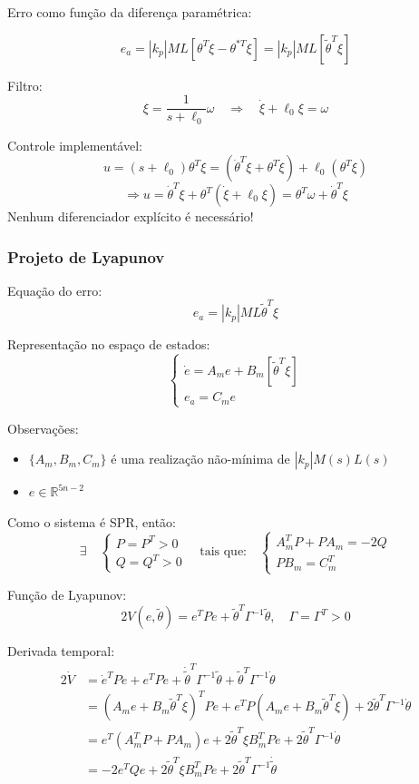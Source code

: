 \documentclass[10pt]{article}
\begin{document}
Erro como função da diferença paramétrica:

\[
e_a = |k_p| ML \left[ \theta^T \xi - \theta^{*T} \xi \right] = |k_p| ML [\tilde{\theta}^T \xi]
\]

Filtro:
\[
\xi = \frac{1}{s + \ell_0} \omega
\quad \Rightarrow \quad \dot{\xi} + \ell_0 \xi = \omega
\]

Controle implementável:
\[
u = (s + \ell_0)\theta^T \xi = (\dot{\theta}^T \xi + \theta^T \dot{\xi}) + \ell_0 (\theta^T \xi)
\]
\[
\Rightarrow u = \dot{\theta}^T \xi + \theta^T (\dot{\xi} + \ell_0 \xi)
= \theta^T \omega + \dot{\theta}^T \xi
\]
Nenhum diferenciador explícito é necessário!

\subsubsection{Projeto de Lyapunov}

Equação do erro:
\[
e_a = |k_p| ML \tilde{\theta}^T \xi
\]

Representação no espaço de estados:
\[
\begin{cases}
\dot{e} = A_m e + B_m [\tilde{\theta}^T \xi] \\
e_a = C_m e
\end{cases}
\]

Observações:
\begin{itemize}
  \item \(\{A_m, B_m, C_m\}\) é uma realização não-mínima de \( |k_p| M(s)L(s) \)
  \item \( e \in \mathbb{R}^{5n - 2} \)
\end{itemize}

Como o sistema é SPR, então:
\[
\exists \quad
\begin{cases}
P = P^T > 0 \\
Q = Q^T > 0
\end{cases}
\quad \text{tais que:} \quad
\begin{cases}
A_m^T P + P A_m = -2Q \\
P B_m = C_m^T
\end{cases}
\]

Função de Lyapunov:
\[
2V(e, \tilde{\theta}) = e^T P e + \tilde{\theta}^T \Gamma^{-1} \tilde{\theta}, \quad \Gamma = \Gamma^T > 0
\]

Derivada temporal:
\[
\begin{aligned}
2\dot{V} &= \dot{e}^T P e + e^T P \dot{e} + \dot{\tilde{\theta}}^T \Gamma^{-1} \tilde{\theta} + \tilde{\theta}^T \Gamma^{-1} \dot{\theta} \\
&= \left(A_m e + B_m \tilde{\theta}^T \xi \right)^T P e + e^T P \left(A_m e + B_m \tilde{\theta}^T \xi \right) + 2 \tilde{\theta}^T \Gamma^{-1} \dot{\theta} \\
&= e^T (A_m^T P + P A_m) e + 2 \tilde{\theta}^T \xi B_m^T P e + 2 \tilde{\theta}^T \Gamma^{-1} \dot{\theta} \\
&= -2 e^T Q e + 2 \tilde{\theta}^T \xi B_m^T P e + 2 \tilde{\theta}^T \Gamma^{-1} \dot{\tilde{\theta}}
\end{aligned}
\]
\end{document}

